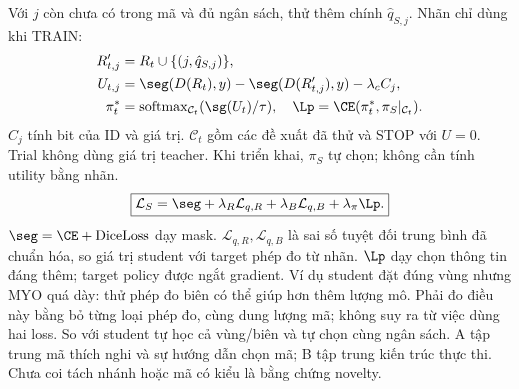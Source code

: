  Với $j$ còn chưa có trong mã và đủ ngân sách, thử thêm chính $\hat q_{S,j}$. Nhãn chỉ dùng khi TRAIN:
\begin{align*}
R'_{t,j}&=R_t\cup\{(j,\hat q_{S,j})\},\\
U_{t,j}&=\seg(D(R_t),y)-\seg(D(R'_{t,j}),y)-\lambda_c C_j,\\
\pi_t^*&=\operatorname{softmax}_{\mathcal C_t}(\sg(U_t)/\tau),
\quad \Lp=\CE(\pi_t^*,\pi_S|_{\mathcal C_t}).
\end{align*}
$C_j$ tính bit của ID và giá trị. $\mathcal C_t$ gồm các đề xuất đã thử và STOP với $U=0$. Trial không dùng giá trị teacher. Khi triển khai, $\pi_S$ tự chọn; không cần tính utility bằng nhãn.
\[
\boxed{\mathcal L_S=\seg+\lambda_R\mathcal L_{q,R}
+\lambda_B\mathcal L_{q,B}+\lambda_\pi\Lp.}
\]
 $\seg=\CE+\operatorname{DiceLoss}$ dạy mask. $\mathcal L_{q,R},\mathcal L_{q,B}$ là sai số tuyệt đối trung bình đã chuẩn hóa, so giá trị student với target phép đo từ nhãn. $\Lp$ dạy chọn thông tin đáng thêm; target policy được ngắt gradient.
 Ví dụ student đặt đúng vùng nhưng MYO quá dày: thử phép đo biên có thể giúp hơn thêm lượng mô. Phải đo điều này bằng bỏ từng loại phép đo, cùng dung lượng mã; không suy ra từ việc dùng hai loss.
 So với student tự học cả vùng/biên và tự chọn cùng ngân sách. A tập trung mã thích nghi và sự hướng dẫn chọn mã; B tập trung kiến trúc thực thi. Chưa coi tách nhánh hoặc mã có kiểu là bằng chứng novelty.
